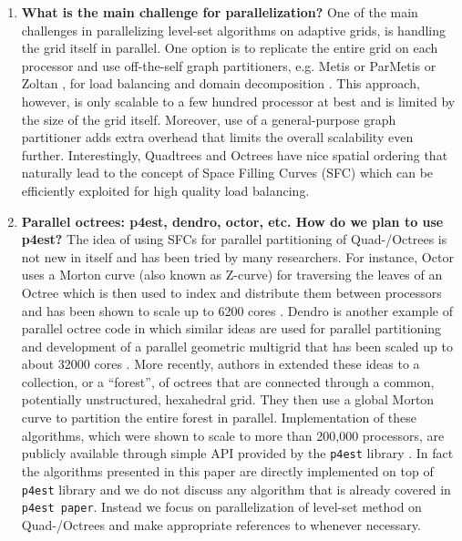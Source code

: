 \begin{enumerate}
\item \textbf{What is the main challenge for parallelization?}
One of the main challenges in parallelizing level-set algorithms on adaptive grids, is handling the grid itself in parallel. One option is to replicate the entire grid on each processor and use off-the-self graph partitioners, e.g. Metis or ParMetis  or Zoltan , for load balancing and domain decomposition . This approach, however, is only scalable to a few hundred processor at best and is limited by the size of the grid itself. Moreover, use of a general-purpose graph partitioner adds extra overhead that limits the overall scalability even further. Interestingly, Quadtrees and Octrees have nice spatial ordering that naturally lead to the concept of Space Filling Curves (SFC)  which can be efficiently exploited for high quality load balancing.

\item \textbf{Parallel octrees: p4est, dendro, octor, etc. How do we plan to use p4est?}
The idea of using SFCs for parallel partitioning of Quad-/Octrees is not new in itself and has been tried by many researchers. For instance, Octor  uses a Morton curve (also known as Z-curve) for traversing the leaves of an Octree which is then used to index and distribute them between processors and has been shown to scale up to 6200 cores . Dendro  is another example of parallel octree code in which similar ideas are used for parallel partitioning and development of a parallel geometric multigrid that has been scaled up to about 32000 cores . More recently, authors in \cite{Burstedde;Wilcox;Ghattas:11:p4est:-Scalable-Algo} extended these ideas to a collection, or a ``forest'', of octrees that are connected through a common, potentially unstructured, hexahedral grid. They then use a global Morton curve to partition the entire forest in parallel. Implementation of these algorithms, which were shown to scale to more than 200,000 processors, are publicly available through simple API provided by the \texttt{p4est} library . In fact the algorithms presented in this paper are directly implemented on top of \texttt{p4est} library and we do not discuss any algorithm that is already covered in \texttt{p4est paper}. Instead we focus on parallelization of level-set method on Quad-/Octrees and make appropriate references to \cite{Burstedde;Wilcox;Ghattas:11:p4est:-Scalable-Algo} whenever necessary.


\end{enumerate}
